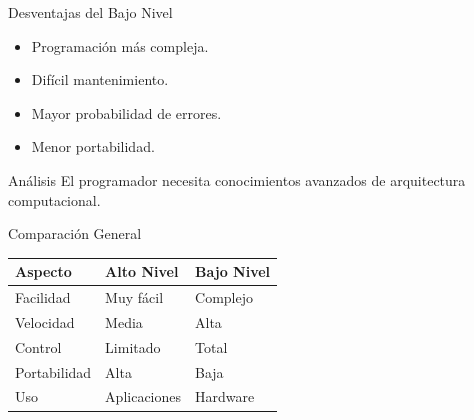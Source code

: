 \documentclass[10pt, aspectratio=169]{beamer}
\begin{document}
	\begin{frame}{Desventajas del Bajo Nivel}
		
		\begin{itemize}
			\item Programación más compleja.
			\item Difícil mantenimiento.
			\item Mayor probabilidad de errores.
			\item Menor portabilidad.
		\end{itemize}
		
		\vspace{0.5cm}
		
		\begin{block}{Análisis}
			El programador necesita conocimientos avanzados de arquitectura computacional.
		\end{block}
		
	\end{frame}
	
	\begin{frame}{Comparación General}
		
		\small
		
		\begin{center}
			
			\begin{tabular}{p{3cm} p{4cm} p{4cm}}
				
				\toprule
				
				\textbf{Aspecto} &
				\textbf{Alto Nivel} &
				\textbf{Bajo Nivel}
				
				\\
				
				\midrule
				
				Facilidad &
				Muy fácil &
				Complejo
				
				\\
				
				Velocidad &
				Media &
				Alta
				
				\\
				
				Control &
				Limitado &
				Total
				
				\\
				
				Portabilidad &
				Alta &
				Baja
				
				\\
				
				Uso &
				Aplicaciones &
				Hardware
				
				\\
				
				\bottomrule
				
			\end{tabular}
			
		\end{center}
		
	\end{frame}
	
\end{document}
